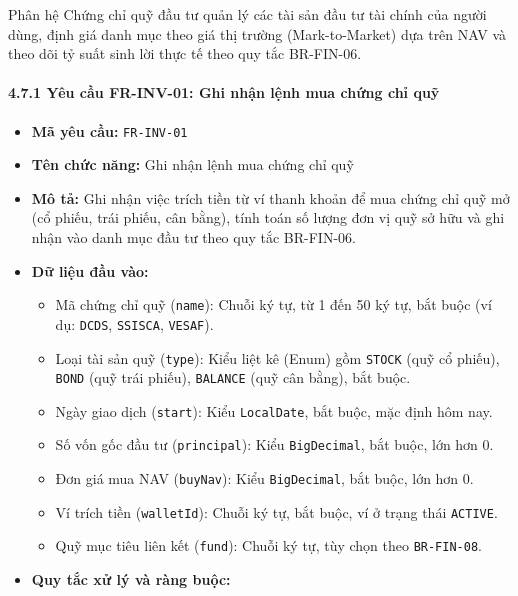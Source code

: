 \documentclass[11pt,a4paper]{article}
\providecommand{\tightlist}{
  \setlength{\itemsep}{0pt}\setlength{\parskip}{0pt}}
\begin{document}
Phân hệ Chứng chỉ quỹ đầu tư quản lý các tài sản đầu tư tài chính của
người dùng, định giá danh mục theo giá thị trường (Mark-to-Market) dựa
trên NAV và theo dõi tỷ suất sinh lời thực tế theo quy tắc BR-FIN-06.

\paragraph{4.7.1 Yêu cầu FR-INV-01: Ghi nhận lệnh mua chứng chỉ
quỹ}\label{471-yuxeau-cux1ea7u-fr-inv-01-ghi-nhux1eadn-lux1ec7nh-mua-chux1ee9ng-chux1ec9-quux1ef9}

\begin{itemize}
\tightlist
\item
  \textbf{Mã yêu cầu:} \texttt{FR-INV-01}
\item
  \textbf{Tên chức năng:} Ghi nhận lệnh mua chứng chỉ quỹ
\item
  \textbf{Mô tả:} Ghi nhận việc trích tiền từ ví thanh khoản để mua
  chứng chỉ quỹ mở (cổ phiếu, trái phiếu, cân bằng), tính toán số lượng
  đơn vị quỹ sở hữu và ghi nhận vào danh mục đầu tư theo quy tắc
  BR-FIN-06.
\item
  \textbf{Dữ liệu đầu vào:}

  \begin{itemize}
  \tightlist
  \item
    Mã chứng chỉ quỹ (\texttt{name}): Chuỗi ký tự, từ 1 đến 50 ký tự,
    bắt buộc (ví dụ: \texttt{DCDS}, \texttt{SSISCA}, \texttt{VESAF}).
  \item
    Loại tài sản quỹ (\texttt{type}): Kiểu liệt kê (Enum) gồm
    \texttt{STOCK} (quỹ cổ phiếu), \texttt{BOND} (quỹ trái phiếu),
    \texttt{BALANCE} (quỹ cân bằng), bắt buộc.
  \item
    Ngày giao dịch (\texttt{start}): Kiểu \texttt{LocalDate}, bắt buộc,
    mặc định hôm nay.
  \item
    Số vốn gốc đầu tư (\texttt{principal}): Kiểu \texttt{BigDecimal},
    bắt buộc, lớn hơn 0.
  \item
    Đơn giá mua NAV (\texttt{buyNav}): Kiểu \texttt{BigDecimal}, bắt
    buộc, lớn hơn 0.
  \item
    Ví trích tiền (\texttt{walletId}): Chuỗi ký tự, bắt buộc, ví ở trạng
    thái \texttt{ACTIVE}.
  \item
    Quỹ mục tiêu liên kết (\texttt{fund}): Chuỗi ký tự, tùy chọn theo
    \texttt{BR-FIN-08}.
  \end{itemize}
\item
  \textbf{Quy tắc xử lý và ràng buộc:}


\end{itemize}
\end{document}
